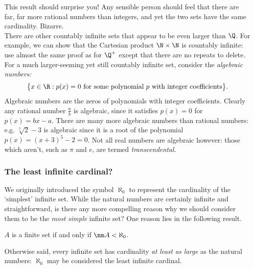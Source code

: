 \noindent This result should surprise you! Any sensible person should feel that there are far, far more rational numbers than integers, and yet the two sets have the same cardinality. Bizarre.\\

There are other countably infinite sets that appear to be even larger than $\Q$. For example, we can show that the Cartesian product $\N\times\N$ is countably infinite: use almost the same proof as for $\Q^+$ except that there are no repeats to delete. For a much larger-seeming yet still countably infinite set, consider the \emph{algebraic numbers:}
\[\big\{x\in\R:p(x)=0\text{ for some polynomial $p$ with integer coefficients}\big\}.\]
Algebraic numbers are the zeros of polynomials with integer coefficients. Clearly any rational number $\frac ab$ is algebraic, since it satisfies $p(x)=0$ for $p(x)=bx-a$. There are many more algebraic numbers than rational numbers: e.g. $\sqrt[5]{2}-3$ is algebraic since it is a root of the polynomial $p(x)=(x+3)^5-2=0$. Not all real numbers are algebraic however: those which aren't, such as $\pi$ and $e$, are termed \emph{transcendental.}

\subsubsection*{The least infinite cardinal?}

We originally introduced the symbol $\aleph_0$ to represent the cardinality of the `simplest' infinite set. While the natural numbers are certainly infinite and straightforward, is there any more compelling reason why we should consider them to be the \emph{most simple} infinite set? One reason lies in the following result.

\begin{thm}\label{thm:finitealeph}
$A$ is a finite set if and only if $\nm A<\aleph_0$.
\end{thm}

\noindent Otherwise said, every infinite set has cardinality \emph{at least as large} as the natural numbers: $\aleph_0$ may be considered the least infinite cardinal.

